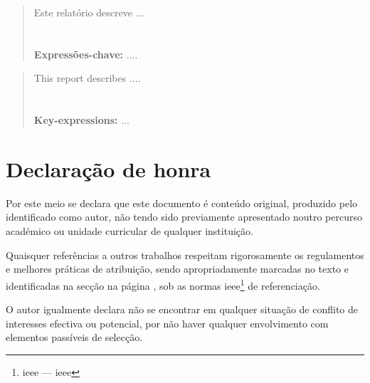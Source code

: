 \begin{abstract}
\label{resumo}

Este relatório descreve ...
\\
\\
\\
\textbf{Expressões-chave:} ....

\end{abstract}


\begin{abstract}
\label{abstract}
This report describes ....
 \\
 \\
 \\
 \textbf{Key-expressions:} ...
 
 
\end{abstract}


\chapter*{Declaração de honra}
\label{way_of_the_samurai}
Por este meio se declara que este documento é conteúdo original, produzido pelo identificado como autor, não tendo sido previamente apresentado noutro percurso académico ou unidade curricular de qualquer instituição.

Quaisquer referências a outros trabalhos respeitam rigorosamente os regulamentos e melhores práticas de
atribuição, sendo apropriadamente marcadas no texto e identificadas na secção \emph{} na página \pageref{chapter:refs}, sob as normas \acrshort{ieee}\footnote{\acrshort{ieee} --- \acrlong{ieee}} de referenciação.

O autor igualmente declara não se encontrar em qualquer situação de conflito de interesses efectiva ou potencial, por não haver qualquer envolvimento com elementos passíveis de selecção.


